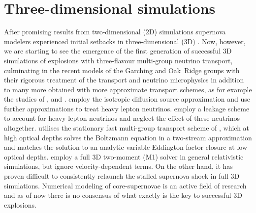 \section{Three-dimensional simulations}
After promising results from 
two-dimensional (2D) simulations supernova modelers experienced initial setbacks in three-dimensional (3D) \citep{hanke_12,hanke_13}.
Now, however, we are starting to see the emergence of the first generation
of successful 3D simulations of explosions with three-flavour
multi-group neutrino transport, culminating in the recent models
of the Garching and Oak~Ridge groups
\citep{melson_15a,melson_15b,lentz_15} with their rigorous treatment
of the transport and neutrino microphysics in addition to many more
obtained with more approximate transport schemes,
as for example the studies of \citet{takiwaki_12,takiwaki_14}, 
\citet{mueller_15b} and \citet{roberts_16}.
\citet{takiwaki_12,takiwaki_14} employ the isotropic diffusion source 
approximation \citep{liebendoerfer_09}
and use further approximations to treat heavy lepton neutrinos.
\cite{takiwaki_14} employ a leakage scheme to account for heavy lepton
neutrinos and \cite{takiwaki_12} neglect the effect of these neutrinos 
altogether. \cite{mueller_15b} utilises the stationary fast multi-group 
transport scheme of \cite{mueller_15a}, which at high optical depths 
solves the Boltzmann equation in a two-stream approximation and
matches the solution to an analytic variable 
Eddington factor closure at low optical depths.
\citet{roberts_16} employ a full 3D two-moment (M1) solver in 
general relativistic simulations, but ignore velocity-dependent
terms.
On the other hand, it has proven difficult to consistently 
relaunch the stalled supernova shock in full 3D simulations.
Numerical modeling of core-supernovae is an active field of
research and as of now there is no consensus of what exactly 
is the key to successful 3D explosions.

